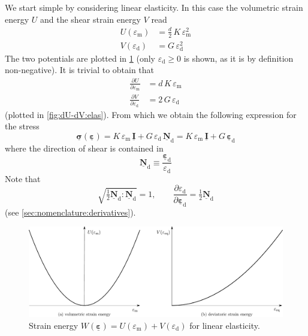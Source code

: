 \documentclass[fleqn, colorlinks]{goose-article}
\newcommand\T[1]{\underline{\bm{{#1}}}}
\begin{document}
We start simple by considering linear elasticity.
In this case the volumetric strain energy $U$ and the shear strain energy $V$ read
\begin{align}
    \label{eq:W:elas}
    U (\varepsilon_\mathrm{m})
    &= \frac{d}{2} \, K \, \varepsilon_\mathrm{m}^2
    \\
    \label{eq:V:elas}
    V (\varepsilon_\mathrm{d})
    &= G \, \varepsilon_\mathrm{d}^2
\end{align}
The two potentials are plotted in \cref{fig:U-V:elas}
(only $\varepsilon_\mathrm{d} \geq 0$ is shown, as it is by definition non-negative).
It is trivial to obtain that
\begin{align}
    \frac{\partial U}{\partial \varepsilon_\mathrm{m}}
    &= d \, K \, \varepsilon_\mathrm{m}
    \\
    \frac{\partial V}{\partial \varepsilon_\mathrm{d}}
    &= 2 \, G \, \varepsilon_\mathrm{d}
\end{align}
(plotted in \cref{fig:dU-dV:elas}).
From which we obtain the following expression for the stress
\begin{equation}
    \label{eq:sig-elas}
    \T{\sigma} ( \T{\varepsilon} )
    =
    K \, \varepsilon_\mathrm{m} \, \T{I}
    +
    G \, \varepsilon_\mathrm{d} \, \T{N}_\mathrm{d}
    =
    K \, \varepsilon_\mathrm{m} \, \T{I}
    +
    G \, \T{\varepsilon}_\mathrm{d}
\end{equation}
where the direction of shear is contained in
\begin{equation}
    \T{N}_\mathrm{d} \equiv \frac{\T{\varepsilon}_\mathrm{d}}{\varepsilon_\mathrm{d}}
\end{equation}
Note that
\begin{equation}
    \sqrt{\tfrac{1}{2} \T{N}_\mathrm{d} : \T{N}_\mathrm{d}} = 1,
    \qquad
    \frac{
        \partial \varepsilon_\mathrm{d}
    }{
        \partial \T{\varepsilon}_\mathrm{d}
    }
    = \tfrac{1}{2} \T{N}_\mathrm{d}
\end{equation}
(see \cref{sec:nomenclature:derivatives}).

\begin{figure}[htp]
    \centering
    \includegraphics[width=1.\textwidth]{figures/potential_U-V_elas}
    \caption{
        Strain energy
        $W(\T{\varepsilon}) = U(\varepsilon_\mathrm{m}) + V(\varepsilon_\mathrm{d})$
        for linear elasticity.}
    \label{fig:U-V:elas}
\end{figure}
\end{document}
